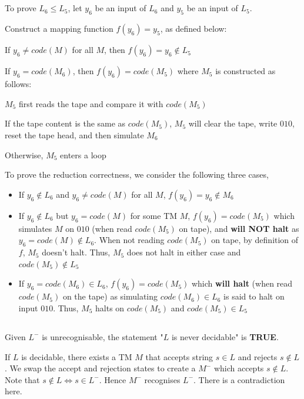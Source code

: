 \documentclass[12pt]{article}
\newcommand{\SubItem}[1]{
    {\setlength\itemindent{15pt} \item[-] #1}
}
\begin{document}
\subsection{}
To prove $L_6 \leq L_5$, let $y_6$ be an input of $L_6$ and $y_5$ be an input of $L_5$.

Construct a mapping function $f(y_6) = y_5$, as defined below:
\begin{itemize}
    \item If $y_6 \neq code(M)$ for all $M$, then $f(y_6) = y_6 \notin L_5$
    \item If $y_6 = code(M_6)$, then $f(y_6) = code(M_5)$ where $M_5$ is constructed as follows:
    \SubItem{$M_5$ first reads the tape and compare it with $code(M_5)$}
    \SubItem{If the tape content is the same as $code(M_5)$, $M_5$ will clear the tape, write $010$, reset the tape head, and then simulate $M_6$}
    \SubItem{Otherwise, $M_5$ enters a loop}
\end{itemize}

To prove the reduction correctness, we consider the following three cases,
\begin{itemize}
    \item If $y_6 \notin L_6$ and $y_6 \neq code(M)$ for all $M$, $f(y_6) = y_6 \notin M_6$
    \item If $y_6 \notin L_6$ but $y_6 = code(M)$ for some TM $M$, $f(y_6) = code(M_5)$ which simulates $M$ on $010$ (when read $code(M_5)$ on tape), and \textbf{will NOT halt} as $y_6 = code(M) \notin L_6$. When not reading $code(M_5)$ on tape, by definition of $f$, $M_5$ doesn't halt. Thus, $M_5$ does not halt in either case and $code(M_5) \notin L_5$
    \item If $y_6 = code(M_6) \in L_6$, $f(y_6) = code(M_5)$ which \textbf{will halt} (when read $code(M_5)$ on the tape) as simulating $code(M_6) \in L_6$ is said to halt on input $010$. Thus, $M_5$ halts on $code(M_5)$ and $code(M_5) \in L_5$
\end{itemize}

\subsection{}

\subsubsection{}
Given $L^-$ is unrecognisable, the statement "$L$ is never decidable" is \textbf{TRUE}.

If $L$ is decidable, there exists a TM $M$ that accepts string $s \in L$ and rejects $s \notin L$. We swap the accept and rejection states to create a $M^-$ which accepts $s \notin L$. Note that $s \notin L \iff s \in L^-$. Hence $M^-$ recognises $L^-$. There is a contradiction here.
\end{document}
